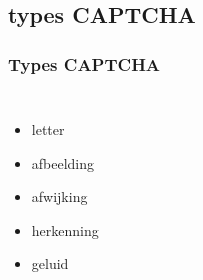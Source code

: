\documentclass{beamer}
\begin{document}
\subsection{types CAPTCHA}
\begin{frame}
  \frametitle{Types CAPTCHA}
  \transfade
   \begin{columns}[c]
       \begin{itemize}
  	     \item<+-> letter
  	     \item<+-> afbeelding
  	     \item<+-> afwijking
  	     \item<+-> herkenning
  	     \item<+-> geluid
       \end{itemize}
       \begin{center}

\end{center}
\end{columns}
\end{frame}
\end{document}
